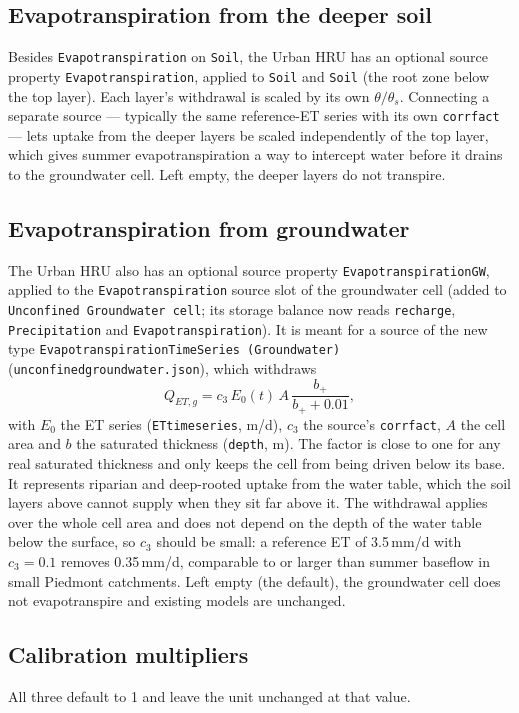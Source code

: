 \documentclass[11pt,a4paper]{article}
\newcommand{\code}[1]{\texttt{\small #1}}
\newcommand{\file}[1]{\texttt{\small #1}}
\renewcommand{\_}{\oldus\allowbreak}   %
\begin{document}
\subsection{Evapotranspiration from the deeper soil}
\label{sec:et2}
Besides \code{Evapotranspiration} on \code{Soil\_1}, the Urban HRU has an optional source property
\code{Evapotranspiration\_2}, applied to \code{Soil\_2} and \code{Soil\_3} (the root zone below the
top layer). Each layer's withdrawal is scaled by its own $\theta/\theta_s$. Connecting a separate
source --- typically the same reference-ET series with its own \code{corr\_fact} --- lets uptake from
the deeper layers be scaled independently of the top layer, which gives summer evapotranspiration a
way to intercept water before it drains to the groundwater cell. Left empty, the deeper layers do not
transpire.

\subsection{Evapotranspiration from groundwater}
\label{sec:etgw}
The Urban HRU also has an optional source property \code{Evapotranspiration\_GW}, applied to the
\code{Evapotranspiration} source slot of the groundwater cell (added to \code{Unconfined Groundwater
cell}; its storage balance now reads \code{recharge}, \code{Precipitation} and
\code{Evapotranspiration}). It is meant for a source of the new type
\code{Evapotranspiration\_Time\_Series (Groundwater)} (\file{unconfined\_groundwater.json}), which
withdraws
\begin{equation}
Q_{ET,g} = c_3\,E_0(t)\,A\,\frac{b_+}{b_+ + 0.01},
\end{equation}
with $E_0$ the ET series (\code{ET\_timeseries}, m/d), $c_3$ the source's \code{corr\_fact}, $A$ the cell
area and $b$ the saturated thickness (\code{depth}, m). The factor is close to one for any real
saturated thickness and only keeps the cell from being driven below its base. It represents riparian
and deep-rooted uptake from the water table, which the soil layers above cannot supply when they sit
far above it. The withdrawal applies over the whole cell area and does not depend on the depth of the
water table below the surface, so $c_3$ should be small: a reference ET of 3.5\,mm/d with $c_3=0.1$
removes 0.35\,mm/d, comparable to or larger than summer baseflow in small Piedmont catchments. Left
empty (the default), the groundwater cell does not evapotranspire and existing models are unchanged.

\subsection{Calibration multipliers}
\label{sec:multipliers}
All three default to 1 and leave the unit unchanged at that value.
\end{document}
